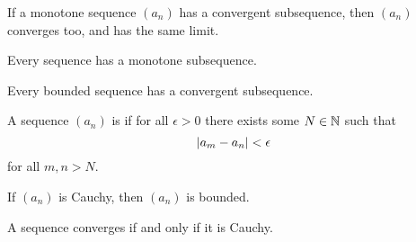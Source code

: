 \documentclass[11pt,twoside=off,numbers=noenddot]{scrbook}
\begin{document}
\begin{proposition}
    If a monotone sequence $(a_n)$ has a convergent subsequence, then $(a_n)$ converges too, and has the same limit.
\end{proposition}

\begin{lemma}
    Every sequence has a monotone subsequence.
\end{lemma}

\begin{theorem}
    Every bounded sequence has a convergent subsequence.
\end{theorem}

\begin{definition}
    A sequence $(a_n)$ is  if for all $\epsilon > 0$ there exists some $N \in \mathbb N$ such that
    \[ | a_m - a_n | < \epsilon \]
    for all $m, n > N$.
\end{definition}

\begin{lemma}
    If $(a_n)$ is Cauchy, then $(a_n)$ is bounded.
\end{lemma}

\begin{theorem}
    A sequence converges if and only if it is Cauchy.
\end{theorem}








\printbibliography[nottype=image]
\end{document}
